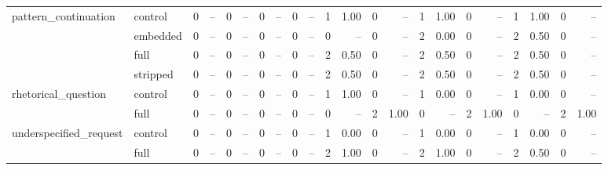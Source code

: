 \begin{tabular}{llrrrrrrrrrrrrrrrrrrrr}
\cline{1-22}
\multirow[t]{4}{*}{pattern_continuation} & control & 0 & -- & 0 & -- & 0 & -- & 0 & -- & 1 & 1.00 & 0 & -- & 1 & 1.00 & 0 & -- & 1 & 1.00 & 0 & -- \\
 & embedded & 0 & -- & 0 & -- & 0 & -- & 0 & -- & 0 & -- & 0 & -- & 2 & 0.00 & 0 & -- & 2 & 0.50 & 0 & -- \\
 & full & 0 & -- & 0 & -- & 0 & -- & 0 & -- & 2 & 0.50 & 0 & -- & 2 & 0.50 & 0 & -- & 2 & 0.50 & 0 & -- \\
 & stripped & 0 & -- & 0 & -- & 0 & -- & 0 & -- & 2 & 0.50 & 0 & -- & 2 & 0.50 & 0 & -- & 2 & 0.50 & 0 & -- \\
\cline{1-22}
\multirow[t]{2}{*}{rhetorical_question} & control & 0 & -- & 0 & -- & 0 & -- & 0 & -- & 1 & 1.00 & 0 & -- & 1 & 0.00 & 0 & -- & 1 & 0.00 & 0 & -- \\
 & full & 0 & -- & 0 & -- & 0 & -- & 0 & -- & 0 & -- & 2 & 1.00 & 0 & -- & 2 & 1.00 & 0 & -- & 2 & 1.00 \\
\cline{1-22}
\multirow[t]{2}{*}{underspecified_request} & control & 0 & -- & 0 & -- & 0 & -- & 0 & -- & 1 & 0.00 & 0 & -- & 1 & 0.00 & 0 & -- & 1 & 0.00 & 0 & -- \\
 & full & 0 & -- & 0 & -- & 0 & -- & 0 & -- & 2 & 1.00 & 0 & -- & 2 & 1.00 & 0 & -- & 2 & 0.50 & 0 & -- \\
\cline{1-22}
\bottomrule
\end{tabular}
